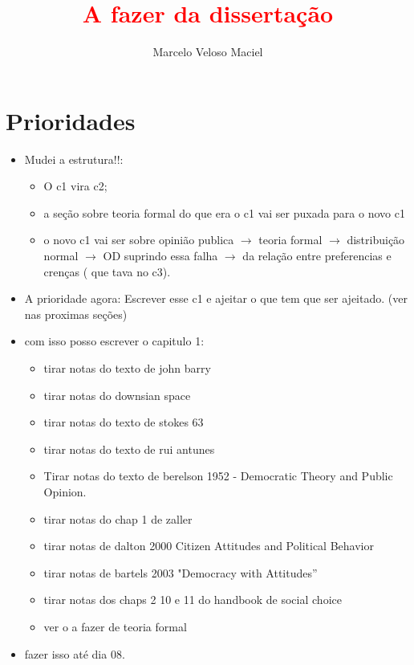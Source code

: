 \documentclass{article}
\title{\textcolor{red}{A fazer da dissertação}}
\author{Marcelo Veloso Maciel}
\date{}
\begin{document}
\pagecolor{base03}
\color{base1}



\maketitle

\section*{Prioridades}

\begin{itemize}
\item  {\Large Mudei a estrutura!!}:
  \begin{itemize}
  \item O c1 vira c2;
  \item a seção sobre teoria formal do que era o c1 vai ser puxada para o novo
    c1
  \item o novo c1 vai ser sobre opinião publica $\rightarrow$ teoria formal $\rightarrow$
    distribuição normal $\rightarrow$ OD suprindo essa falha $\rightarrow$ da relação entre
    preferencias e crenças ( que tava no c3). 
  \end{itemize}
  \item {\Large A prioridade agora: Escrever esse c1 e ajeitar o que tem que ser
      ajeitado. (ver nas proximas seções)}
\item {\Large com isso posso escrever o capitulo 1:}
    \begin{itemize}
    \item tirar notas do texto de john barry
    \item tirar notas do downsian space
    \item tirar notas do texto de stokes 63
    \item tirar notas do texto de rui antunes 
    \item Tirar notas do texto de berelson 1952 - Democratic Theory and Public Opinion.
    \item tirar notas do chap 1 de zaller
    \item tirar notas de dalton 2000 Citizen Attitudes and Political Behavior
    \item tirar notas de bartels 2003 "Democracy with Attitudes''
    \item tirar notas dos chaps 2 10 e 11 do handbook de social choice
    \item ver o a fazer de teoria formal
    \end{itemize}
\item {\Large fazer isso até dia 08.}
\end{itemize}
\end{document}
